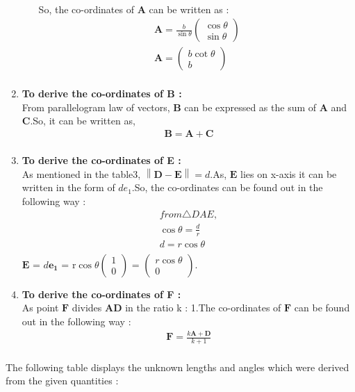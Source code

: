 \documentclass{article}
\providecommand{\norm}[1]{\left\lVert#1\right\rVert}
\newcommand{\myvec}[1]{\ensuremath{\begin{pmatrix}#1\end{pmatrix}}}
\let\vec\mathbf
\begin{document}
\begin{enumerate}
\begin{enumerate}
\begin{align}
		\end{align}
		So, the co-ordinates of $\vec{A}$ can be written as :\\
		\begin{align}
			\vec{A} = \frac{b}{\sin{\theta}}\myvec{\cos{\theta}\\\sin{\theta}}\\
			\vec{A} = \myvec{b\cot{\theta}\\b}\\
		\end{align}
		\end{enumerate}
	\item \textbf{To derive the co-ordinates of B :}\\
		From parallelogram law of vectors, $\vec{B}$ can be expressed as the sum of $\vec{A}$ and $\vec{C}$.So, it can be written as,\\
		\begin{align}
			\vec{B} = \vec{A} + \vec{C}\\
		\end{align}
	\item \textbf{To derive the co-ordinates of E :}\\
		As mentioned in the table3, $\norm{\vec{D} - \vec{E}} = d$.As, $\vec{E}$ lies on x-axis it can be written in the form of $de_1$.So, the co-ordinates can be found out in the following way : \\
		\begin{align}
			from \triangle{DAE},\\
			\cos{\theta} = \frac{d}{r}\\
			d = r\cos{\theta}\\
		\end{align}
		 $\vec{E}$ = $d\vec{e_1}$ = r$\cos{\theta}\myvec{1\\0}$ = $\myvec{r\cos{\theta}\\0}$.\\
	 \item \textbf{To derive the co-ordinates of F :}\\
		 As point $\vec{F}$ divides $\vec{AD}$ in the ratio k : 1.The co-ordinates of $\vec{F}$ can be found out in the following way : \\
		 \begin{align}
			 \vec{F} = \frac{k\vec{A} + \vec{D}}{k + 1}\\
		 \end{align}
\end{enumerate}
The following table displays the unknown lengths and angles which were derived from the given quantities :\\
\end{document}
